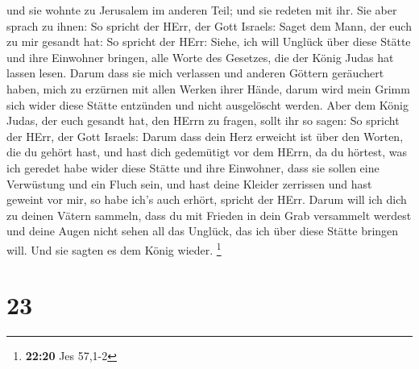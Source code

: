 und sie wohnte zu Jerusalem im anderen Teil; und sie redeten mit ihr.
 Sie aber sprach zu ihnen: So spricht der HErr, der Gott
Israels: Saget dem Mann, der euch zu mir gesandt hat:  So
spricht der HErr: Siehe, ich will Unglück über diese Stätte und ihre
Einwohner bringen, alle Worte des Gesetzes, die der König Judas hat
lassen lesen.  Darum dass sie mich verlassen und anderen
Göttern geräuchert haben, mich zu erzürnen mit allen Werken ihrer Hände,
darum wird mein Grimm sich wider diese Stätte entzünden und nicht
ausgelöscht werden.  Aber dem König Judas, der euch gesandt
hat, den HErrn zu fragen, sollt ihr so sagen: So spricht der HErr, der
Gott Israels:  Darum dass dein Herz erweicht ist über den
Worten, die du gehört hast, und hast dich gedemütigt vor dem HErrn, da
du hörtest, was ich geredet habe wider diese Stätte und ihre Einwohner,
dass sie sollen eine Verwüstung und ein Fluch sein, und hast deine
Kleider zerrissen und hast geweint vor mir, so habe ich's auch erhört,
spricht der HErr.  Darum will ich dich zu deinen Vätern
sammeln, dass du mit Frieden in dein Grab versammelt werdest und deine
Augen nicht sehen all das Unglück, das ich über diese Stätte bringen
will. Und sie sagten es dem König wieder. \footnote{\textbf{22:20} Jes
  57,1-2}

\hypertarget{section-6}{%
\section{23}\label{section-6}}


